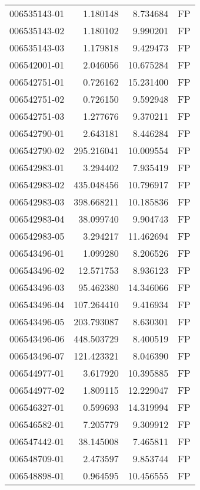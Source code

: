 \begin{tabular}{lrrl}
006535143-01 &    1.180148 &       8.734684 &   FP \\
006535143-02 &    1.180102 &       9.990201 &   FP \\
006535143-03 &    1.179818 &       9.429473 &   FP \\
006542001-01 &    2.046056 &      10.675284 &   FP \\
006542751-01 &    0.726162 &      15.231400 &   FP \\
006542751-02 &    0.726150 &       9.592948 &   FP \\
006542751-03 &    1.277676 &       9.370211 &   FP \\
006542790-01 &    2.643181 &       8.446284 &   FP \\
006542790-02 &  295.216041 &      10.009554 &   FP \\
006542983-01 &    3.294402 &       7.935419 &   FP \\
006542983-02 &  435.048456 &      10.796917 &   FP \\
006542983-03 &  398.668211 &      10.185836 &   FP \\
006542983-04 &   38.099740 &       9.904743 &   FP \\
006542983-05 &    3.294217 &      11.462694 &   FP \\
006543496-01 &    1.099280 &       8.206526 &   FP \\
006543496-02 &   12.571753 &       8.936123 &   FP \\
006543496-03 &   95.462380 &      14.346066 &   FP \\
006543496-04 &  107.264410 &       9.416934 &   FP \\
006543496-05 &  203.793087 &       8.630301 &   FP \\
006543496-06 &  448.503729 &       8.400519 &   FP \\
006543496-07 &  121.423321 &       8.046390 &   FP \\
006544977-01 &    3.617920 &      10.395885 &   FP \\
006544977-02 &    1.809115 &      12.229047 &   FP \\
006546327-01 &    0.599693 &      14.319994 &   FP \\
006546582-01 &    7.205779 &       9.309912 &   FP \\
006547442-01 &   38.145008 &       7.465811 &   FP \\
006548709-01 &    2.473597 &       9.853744 &   FP \\
006548898-01 &    0.964595 &      10.456555 &   FP \\

\end{tabular}
